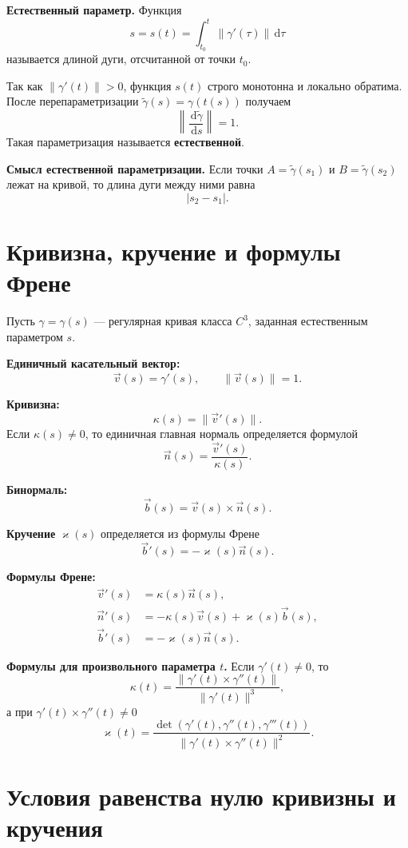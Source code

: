 \documentclass[12pt,a4paper]{article}
\newcommand{\dd}{\,\mathrm{d}}
\begin{document}
\textbf{Естественный параметр.}
Функция
\[
s=s(t)=\int_{t_0}^t \|\gamma'(\tau)\|\dd \tau
\]
называется длиной дуги, отсчитанной от точки $t_0$.

Так как $\|\gamma'(t)\|>0$, функция $s(t)$ строго монотонна и локально обратима.
После перепараметризации $\tilde{\gamma}(s)=\gamma(t(s))$ получаем
\[
\left\|\frac{\dd\tilde{\gamma}}{\dd s}\right\|=1.
\]
Такая параметризация называется \textbf{естественной}.

\textbf{Смысл естественной параметризации.}
Если точки $A=\tilde{\gamma}(s_1)$ и $B=\tilde{\gamma}(s_2)$ лежат на кривой,
то длина дуги между ними равна
\[
|s_2-s_1|.
\]

\section{Кривизна, кручение и формулы Френе}

Пусть $\gamma=\gamma(s)$ --- регулярная кривая класса $C^3$, заданная
естественным параметром $s$.

\textbf{Единичный касательный вектор:}
\[
\vec{v}(s)=\gamma'(s),\qquad \|\vec{v}(s)\|=1.
\]

\textbf{Кривизна:}
\[
\kappa(s)=\|\vec{v}'(s)\|.
\]
Если $\kappa(s)\neq 0$, то единичная главная нормаль определяется формулой
\[
\vec{n}(s)=\frac{\vec{v}'(s)}{\kappa(s)}.
\]

\textbf{Бинормаль:}
\[
\vec{b}(s)=\vec{v}(s)\times \vec{n}(s).
\]

\textbf{Кручение} $\varkappa(s)$ определяется из формулы Френе
\[
\vec{b}'(s)=-\varkappa(s)\vec{n}(s).
\]

\textbf{Формулы Френе:}
\begin{align*}
\vec{v}'(s) &= \kappa(s)\vec{n}(s),\\
\vec{n}'(s) &= -\kappa(s)\vec{v}(s)+\varkappa(s)\vec{b}(s),\\
\vec{b}'(s) &= -\varkappa(s)\vec{n}(s).
\end{align*}

\textbf{Формулы для произвольного параметра $t$.}
Если $\gamma'(t)\neq 0$, то
\[
\kappa(t)=\frac{\|\gamma'(t)\times\gamma''(t)\|}{\|\gamma'(t)\|^3},
\]
а при $\gamma'(t)\times\gamma''(t)\neq 0$
\[
\varkappa(t)=
\frac{\det(\gamma'(t),\gamma''(t),\gamma'''(t))}
{\|\gamma'(t)\times\gamma''(t)\|^2}.
\]

\section{Условия равенства нулю кривизны и кручения}
\end{document}
